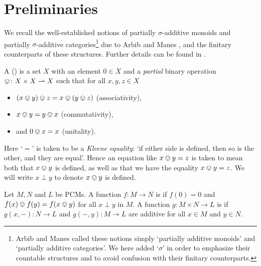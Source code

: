 \documentclass[%
	submission,
copyright,creativecommons,UKenglish]{eptcs}
\begin{document}
\section{Preliminaries}




We recall
the well-established notions of
partially $\sigma$-additive monoids
and partially $\sigma$-additive categories\footnote{%
Arbib and Manes
called these notions simply `partially additive monoids'
and `partially additive categories'.
We here added `$\sigma$' in order to emphasize their
countable structures and to avoid confusion with
their finitary counterparts.}
due to Arbib and Manes \cite{ArbibM1980,ManesA1986},
and the finitary counterparts of these structures.
Further details can be found in \cite{Cho2019PhD}.

\begin{definition}
\label{def:pcm}
A 
()
is a set $X$ with an element $0\in X$ 
and a \emph{partial} binary operation
$\ovee\colon X\times X\rightharpoonup X$
such that for all $x,y,z \in X$
\begin{itemize}
	\item $(x\ovee y)\ovee z = x\ovee(y\ovee z)$ (associativity),
	\item $x\ovee y= y\ovee x$ (commutativity),
	\item and $0\ovee x = x$ (unitality).
\end{itemize}
Here `$=$' is taken to be a \emph{Kleene equality}:
`if either side is defined, then so is the other,
and they are equal'. 
Hence an equation like $x\ovee y = z$ is taken to
mean both that $x\ovee y$ is defined, as well 
as that we have the equality $x\ovee y = z$.
We will write $x\perp y$ to denote $x\ovee y$ is defined.

Let $M,N$ and $L$ be PCMs.
A function $f:M\rightarrow N$ is  if $f(0)=0$ and
$f(x)\ovee f(y) = f(x\ovee y)$ for all $x\perp y$ in $M$.
A function $g\colon M\times N\to L$
is 
if $g(x,-)\colon N\to L$
and $g(-,y)\colon M\to L$ are additive
for all $x\in M$ and $y\in N$.
\end{definition}
\end{document}
